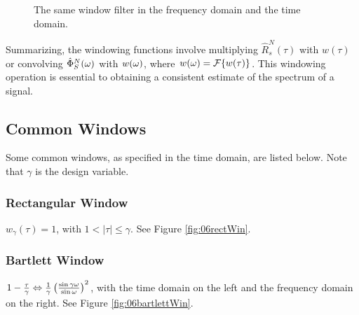 \documentclass[lecture,12pt,]{pcms-l}
\begin{document}
\begin{figure}[ht!]
	\centering
	 \hfill
	\caption{The same window filter in the  frequency domain and the  time domain.}
	\label{fig:06windowfilter}
\end{figure}

Summarizing, the windowing functions involve multiplying $\hat{R}_s^N(\tau)$ with $w(\tau)$ or convolving $\hat{\Phi}_S^N(\omega)$ with $w(\omega)$, where $w(\omega)=\mathcal{F}\{w(\tau)\}$. This windowing operation is essential to obtaining a consistent estimate of the spectrum of a signal.

\subsection{Common Windows}
Some common windows, as specified in the time domain, are listed below. Note that $\gamma$ is the design variable.

\subsubsection{Rectangular Window}
$w_\gamma(\tau) = 1$, with $1<|\tau|\leq\gamma$. See Figure \ref{fig:06rectWin}.

\subsubsection{Bartlett Window}
$1-\frac{\tau}{\gamma} \Leftrightarrow \frac{1}{\gamma}\left(\frac{\sin\gamma\omega}{\sin\omega}\right)^2$, with the time domain on the left and the frequency domain on the right. See Figure \ref{fig:06bartlettWin}.
\end{document}
